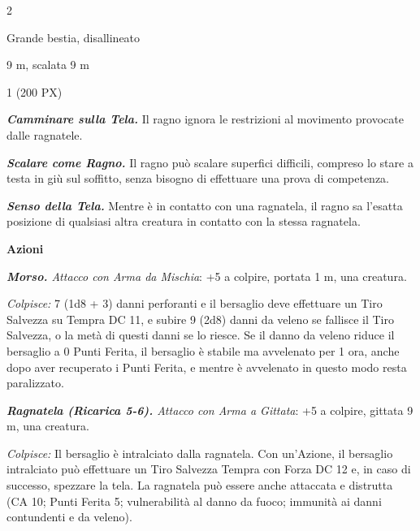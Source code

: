 \begin{multicols}{2}
{
\begin{description}[noitemsep, topsep=0pt, parsep=0pt, partopsep=0pt, itemsep=1pt, leftmargin=2.35cm,  labelwidth=2.2cm, itemindent=0cm, listparindent=0pt] %
\setlength{\baselineskip}{10pt}
\item[\textbf{Taglia/Tipo}] Grande bestia, disallineato
\item[\textbf{Caratt.}] 
\item[\textbf{Punti Ferita}] 
\item[\textbf{Tiri Salvez.}] 
\item[\textbf{Movimento}] 9 m, scalata 9 m
\item[\textbf{Sfida}] 1 (200 PX)
\end{description}
\smallskip

\emph{\textbf{Camminare sulla Tela.}} Il ragno ignora le restrizioni al movimento provocate dalle ragnatele.

\emph{\textbf{Scalare come Ragno.}} Il ragno può scalare superfici difficili, compreso lo stare a testa in giù sul soffitto, senza bisogno di effettuare una prova di competenza.

\emph{\textbf{Senso della Tela.}} Mentre è in contatto con una ragnatela, il ragno sa l'esatta posizione di qualsiasi altra creatura in contatto con la stessa ragnatela.

\textbf{Azioni}

\emph{\textbf{Morso.} Attacco con Arma da Mischia}: +5 a colpire, portata 1 m, una creatura.

\emph{Colpisce:} 7 (1d8 + 3) danni perforanti e il bersaglio deve effettuare un Tiro Salvezza su Tempra DC 11, e subire 9 (2d8) danni da veleno se fallisce il Tiro Salvezza, o la metà di questi danni se lo riesce. Se il danno da veleno riduce il bersaglio a 0 Punti Ferita, il bersaglio è stabile ma avvelenato per 1 ora, anche dopo aver recuperato i Punti Ferita, e mentre è avvelenato in questo modo resta paralizzato.

\emph{\textbf{Ragnatela (Ricarica 5-6).} Attacco con Arma a Gittata}: +5 a colpire, gittata 9 m, una creatura.

\emph{Colpisce:} Il bersaglio è intralciato dalla ragnatela. Con un'Azione, il bersaglio intralciato può effettuare un Tiro Salvezza Tempra con Forza DC 12 e, in caso di successo, spezzare la tela. La ragnatela può essere anche attaccata e distrutta (CA 10; Punti Ferita 5; vulnerabilità al danno da fuoco; immunità ai danni contundenti e da veleno).

}
\end{multicols}
